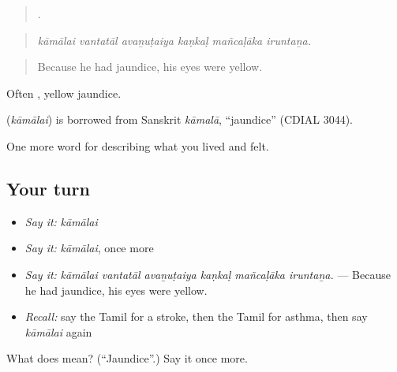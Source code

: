 \begin{quote}
     .
\end{quote}

\begin{quote}
\emph{kāmālai vantatāl avaṉuṭaiya kaṇkaḷ mañcaḷāka iruntaṉa.}
\end{quote}

\begin{quote}
Because he had jaundice, his eyes were yellow.
\end{quote}

Often  , yellow jaundice.

\begin{cousinweb}
\textbf{} (\emph{kāmālai}) is borrowed from Sanskrit \emph{kāmalā}, \textquotedblleft{}jaundice\textquotedblright{} (CDIAL 3044).
\end{cousinweb}

\begin{grammarlens}[title={What you've built}]
One more word for describing what you lived and felt.
\end{grammarlens}

\subsection*{Your turn}
\begin{itemize}
\raggedright
  \item \emph{Say it:} \emph{kāmālai}
  \item \emph{Say it:} \emph{kāmālai}, once more
  \item \emph{Say it:} \emph{kāmālai vantatāl avaṉuṭaiya kaṇkaḷ mañcaḷāka iruntaṉa.} — Because he had jaundice, his eyes were yellow.
  \item \emph{Recall:} say the Tamil for a stroke, then the Tamil for asthma, then say \emph{kāmālai} again
\end{itemize}

\begin{tcolorbox}[breakable,colback=teal!4,colframe=teal!35!black,title={Before you move on}]
What does  mean? (\textquotedblleft{}Jaundice\textquotedblright{}.) Say it once more.
\end{tcolorbox}
